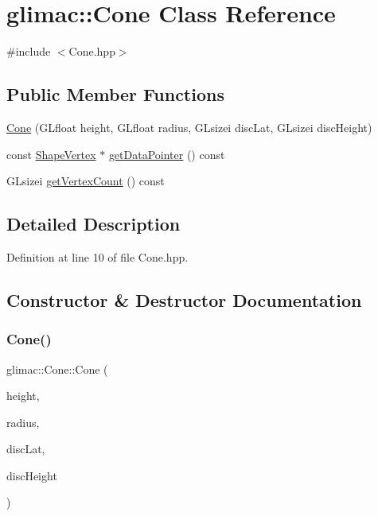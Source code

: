 \hypertarget{classglimac_1_1_cone}{}\section{glimac\+:\+:Cone Class Reference}
\label{classglimac_1_1_cone}


{\ttfamily \#include $<$Cone.\+hpp$>$}

\subsection*{Public Member Functions}
\begin{DoxyCompactItemize}
\item 
\hyperlink{classglimac_1_1_cone_ab404498854c02fec6129d4233b58c70f}{Cone} (G\+Lfloat height, G\+Lfloat radius, G\+Lsizei disc\+Lat, G\+Lsizei disc\+Height)
\item 
const \hyperlink{structglimac_1_1_shape_vertex}{Shape\+Vertex} $\ast$ \hyperlink{classglimac_1_1_cone_a937d01989c21e55c5df5c298beab1285}{get\+Data\+Pointer} () const
\item 
G\+Lsizei \hyperlink{classglimac_1_1_cone_a7185ac37a58d1f4e176422c214cdcce5}{get\+Vertex\+Count} () const
\end{DoxyCompactItemize}


\subsection{Detailed Description}


Definition at line 10 of file Cone.\+hpp.



\subsection{Constructor \& Destructor Documentation}
\mbox{\label{classglimac_1_1_cone_ab404498854c02fec6129d4233b58c70f}} 
\subsubsection{\texorpdfstring{Cone()}{Cone()}}
{\footnotesize\ttfamily glimac\+::\+Cone\+::\+Cone (\begin{DoxyParamCaption}\item[{G\+Lfloat}]{height,  }\item[{G\+Lfloat}]{radius,  }\item[{G\+Lsizei}]{disc\+Lat,  }\item[{G\+Lsizei}]{disc\+Height }\end{DoxyParamCaption})\hspace{0.3cm}{\ttfamily [inline]}}



